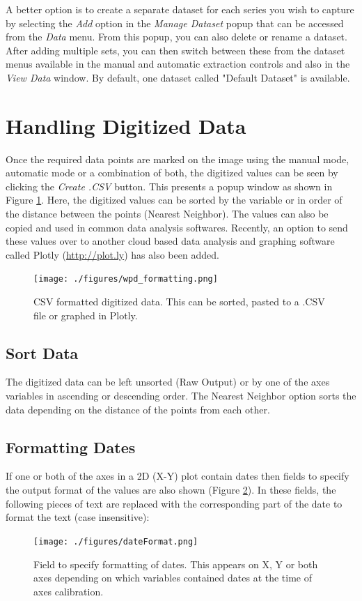 \documentclass[letterpaper, 10pt]{article}
\begin{document}
A better option is to create a separate dataset for each series you wish to capture by selecting the \emph{Add} option in the \emph{Manage Dataset} popup that can be accessed from the \emph{Data} menu. From this popup, you can also delete or rename a dataset. After adding multiple sets, you can then switch between these from the dataset menus available in the manual and automatic extraction controls and also in the \emph{View Data} window. By default, one dataset called "Default Dataset" is available.

 
\section{Handling Digitized Data}
Once the required data points are marked on the image using the manual mode, automatic mode or a combination of both, the digitized values can be seen by clicking the \emph{Create .CSV} button. This presents a popup window as shown in Figure \ref{fig:csvOutput}. Here, the digitized values can be sorted by the variable or in order of the distance between the points (Nearest Neighbor). The values can also be copied and used in common data analysis softwares. Recently, an option to send these values over to another cloud based data analysis and graphing software called Plotly (\url{http://plot.ly}) has also been added.
 
\begin{figure}
\begin{center}
\texttt{[image: ./figures/wpd\_formatting.png]}
\caption{CSV formatted digitized data. This can be sorted, pasted to a .CSV file or graphed in Plotly.}
\label{fig:csvOutput}
\end{center}
\end{figure}
\subsection{Sort Data}
The digitized data can be left unsorted (Raw Output) or by one of the axes variables in ascending or descending order. The Nearest Neighbor option sorts the data depending on the distance of the points from each other.
\subsection{Formatting Dates}
\label{sec:formattingDatesCSV}
If one or both of the axes in a 2D (X-Y) plot contain dates then fields to specify the output format of the values are also shown (Figure \ref{fig:dateFormat}). In these fields, the following pieces of text are replaced with the corresponding part of the date to format the text (case insensitive):
\begin{figure}
\begin{center}
\texttt{[image: ./figures/dateFormat.png]}
\caption{Field to specify formatting of dates. This appears on X, Y or both axes depending on which variables contained dates at the time of axes calibration.}
\label{fig:dateFormat}
\end{center}
\end{figure}
\end{document}

